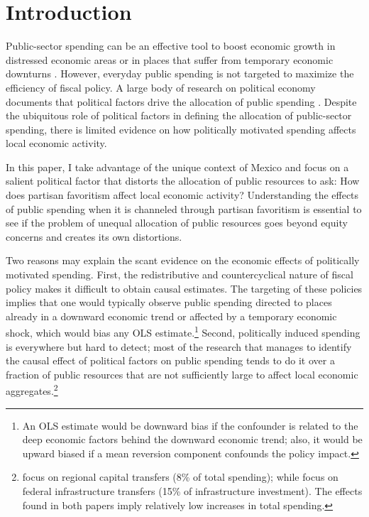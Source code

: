 \documentclass[dv_diss_main.tex]{subfiles}
\begin{document}
\section{Introduction}

\noindent Public-sector spending can be an effective tool to boost economic growth in distressed economic areas or in places that suffer from temporary economic downturns \citep{chodorow2019geographic}.
However, everyday public spending is not targeted to maximize the efficiency of fiscal policy.  A large body of research on political economy documents that political factors drive the allocation of public spending \citep{golden2013distributive}.
Despite the ubiquitous role of political factors in defining the allocation of public-sector spending, there is limited evidence on how politically motivated spending affects local economic activity.

In this paper, I take advantage of the unique context of Mexico and focus on a salient political factor that distorts the allocation of public resources to ask: How does partisan favoritism affect local economic activity? Understanding the effects of public spending when it is channeled through partisan favoritism is essential to see if the problem of unequal allocation of public resources goes beyond equity concerns and creates its own distortions.

Two reasons may explain the scant evidence on the economic effects of politically motivated spending. First, the redistributive and countercyclical nature of fiscal policy makes it difficult to obtain causal estimates. The targeting of these policies implies that one would typically observe public spending directed to places already in a downward economic trend or affected by a temporary economic shock, which would bias any OLS estimate.\footnote{An OLS estimate would be downward bias if the confounder is related to the deep economic factors behind the downward economic trend; also, it would be upward biased if a mean reversion component confounds the policy impact.}
Second, politically induced spending is everywhere but hard to detect; most of the research that manages to identify the causal effect of political factors on public spending tends to do it over a fraction of public resources that are not sufficiently large to affect local economic aggregates.\footnote{\cite{curto2018does} focus on regional capital transfers (8\% of total spending); while \cite{brollo2012tying} focus on federal infrastructure transfers (15\% of infrastructure investment). The effects found in both papers imply relatively low increases in total spending.}
\end{document}
